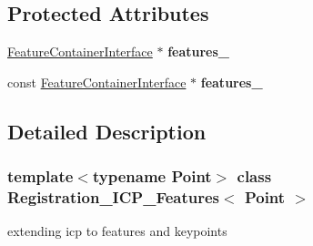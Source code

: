 \subsection*{Protected Attributes}
\begin{DoxyCompactItemize}
\item 
\hypertarget{classRegistration__ICP__Features_a1a47588deb521b8eaf140f262ab7511e}{
\hyperlink{classFeatureContainerInterface}{FeatureContainerInterface} $\ast$ {\bfseries features\_\-}}
\label{classRegistration__ICP__Features_a1a47588deb521b8eaf140f262ab7511e}

\item 
\hypertarget{classRegistration__ICP__Features_a8b93595575938bd37e96dd4bbdf5f8a7}{
const \hyperlink{classFeatureContainerInterface}{FeatureContainerInterface} $\ast$ {\bfseries features\_\-}}
\label{classRegistration__ICP__Features_a8b93595575938bd37e96dd4bbdf5f8a7}

\end{DoxyCompactItemize}


\subsection{Detailed Description}
\subsubsection*{template$<$typename Point$>$ class Registration\_\-ICP\_\-Features$<$ Point $>$}

extending icp to features and keypoints 


